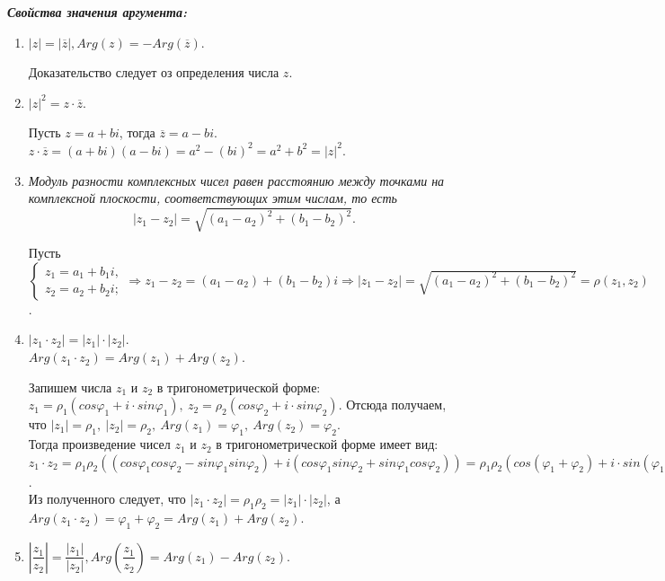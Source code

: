 \textbf{\textit{Свойства значения аргумента:}}\begin{enumerate}
	\item $|z| = |\overline{z}|, Arg(z) = -Arg(\overline{z})$.\begin{Proof}
		Доказательство следует оз определения числа $z$.
	\end{Proof}
	\item $|z|^2 = z\cdot\overline{z}$.\begin{Proof}
		Пусть $z = a + bi$, тогда $\overline{z} = a - bi$.\\
		$z\cdot\overline{z} = (a+bi)(a-bi) = a^2 - (bi)^2 = a^2 + b^2 = |z|^2$.
	\end{Proof}
	\item \textit{Модуль разности комплексных чисел равен расстоянию между точками на комплексной плоскости, соответствующих этим числам, то есть $$|z_1 - z_2| = \sqrt{(a_1 - a_2)^2 + (b_1 - b_2)^2}.$$}
	\begin{Proof}
		Пусть $\begin{cases}
			z_1 = a_1 + b_1 i,\\
			z_2 = a_2 + b_2 i;
		\end{cases}\Rightarrow z_1 - z_2 = (a_1 - a_2) + (b_1 - b_2)i\Rightarrow |z_1 - z_2| = \sqrt{(a_1 - a_2)^2 + (b_1 - b_2)^2} = \rho(z_1, z_2)$.
	\end{Proof}
	\item $|z_1\cdot z_2| = |z_1|\cdot|z_2|$.\\
	$Arg(z_1\cdot z_2) = Arg(z_1) + Arg(z_2).$\begin{Proof}
		Запишем числа $z_1$ и $z_2$ в тригонометрической форме: $z_1 = \rho_1(cos\varphi_1 + i\cdot sin\varphi_1),\ z_2 = \rho_2(cos\varphi_2 + i\cdot sin\varphi_2)$. Отсюда получаем, что $|z_1| = \rho_1,\ |z_2| = \rho_2,\ Arg(z_1) = \varphi_1,\ Arg(z_2) = \varphi_2$. \\Тогда произведение чисел $z_1$ и $z_2$ в тригонометрической форме имеет вид: $z_1\cdot z_2 = \rho_1\rho_2((cos\varphi_1cos\varphi_2 - sin\varphi_1sin\varphi_2) + i(cos\varphi_1sin\varphi_2 + sin\varphi_1cos\varphi_2)) = \rho_1\rho_2(cos(\varphi_1 + \varphi_2) + i\cdot sin(\varphi_1 + \varphi_2))$. \\Из полученного следует, что $|z_1\cdot z_2| = \rho_1\rho_2 = |z_1|\cdot|z_2|$, а $Arg(z_1\cdot z_2) = \varphi_1 + \varphi_2 = Arg(z_1) + Arg(z_2)$.
	\end{Proof}
	\item $\left | \dfrac{z_1}{z_2} \right | = \dfrac{|z_1|}{|z_2|}, Arg(\dfrac{z_1}{z_2}) = Arg(z_1) - Arg(z_2)$.\begin{Proof}

\end{Proof}
\end{enumerate}

